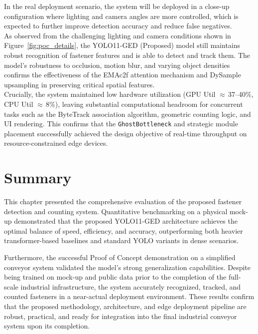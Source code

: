 In the real deployment scenario, the system will be deployed in a close-up configuration where lighting and camera angles are more controlled, which is expected to further improve detection accuracy and reduce false negatives. \\

As observed from the challenging lighting and camera conditions shown in Figure~\ref{fig:poc_details}, the YOLO11-GED (Proposed) model still maintains robust recognition of fastener features and is able to detect and track them. The model's robustness to occlusion, motion blur, and varying object densities confirms the effectiveness of the EMAc2f attention mechanism and DySample upsampling in preserving critical spatial features.\\

Crucially, the system maintained low hardware utilization (GPU Util $\approx$\,37--40\%, CPU Util $\approx$\,8\%), leaving substantial computational headroom for concurrent tasks such as the ByteTrack association algorithm, geometric counting logic, and UI rendering. This confirms that the \texttt{GhostBottleneck} and strategic module placement successfully achieved the design objective of real-time throughput on resource-constrained edge devices.

\section{Summary}
This chapter presented the comprehensive evaluation of the proposed fastener detection and counting system. Quantitative benchmarking on a physical mock-up demonstrated that the proposed YOLO11-GED architecture achieves the optimal balance of speed, efficiency, and accuracy, outperforming both heavier transformer-based baselines and standard YOLO variants in dense scenarios.

Furthermore, the successful Proof of Concept demonstration on a simplified conveyor system validated the model's strong generalization capabilities. Despite being trained on mock-up and public data prior to the completion of the full-scale industrial infrastructure, the system accurately recognized, tracked, and counted fasteners in a near-actual deployment environment. These results confirm that the proposed methodology, architecture, and edge deployment pipeline are robust, practical, and ready for integration into the final industrial conveyor system upon its completion.
